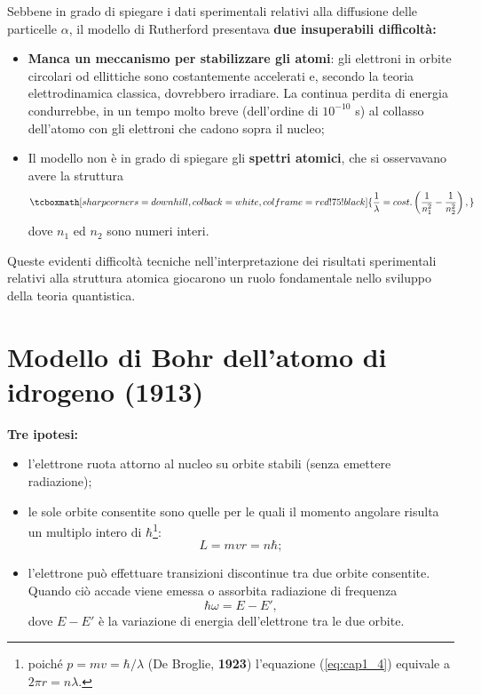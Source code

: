 \documentclass[a4paper,12pt,oneside]{book}
\begin{document}
Sebbene in grado di spiegare i dati sperimentali relativi alla diffusione delle particelle $\alpha$, il modello di Rutherford presentava \textbf{due insuperabili difficoltà:}
	\begin{itemize}
		\item \textbf{Manca un meccanismo per stabilizzare gli atomi}: gli elettroni in orbite circolari od ellittiche sono costantemente accelerati e, secondo la teoria elettrodinamica classica, dovrebbero irradiare. La continua perdita di energia condurrebbe, in un tempo molto breve (dell'ordine di $10^{-10}$ s) al collasso dell'atomo con gli elettroni che cadono sopra il nucleo;
		\item Il modello non è in grado di spiegare gli \textbf{spettri atomici}, che si osservavano avere la struttura
			\begin{equation}
				\tcboxmath[sharp corners=downhill ,colback=white,colframe=red!75!black]{
					\frac{1}{\lambda} = cost. \left( \frac{1}{n_1 ^2}-\frac{1}{n_2 ^2} \right),
					}
			\end{equation}
		dove $n_1$ ed $n_2$ sono numeri interi.\\
\end{itemize}

Queste evidenti difficoltà tecniche nell'interpretazione dei risultati sperimentali relativi alla struttura atomica giocarono un ruolo fondamentale nello sviluppo della teoria quantistica.
\section{Modello di Bohr dell'atomo di idrogeno (1913)}
\textbf{Tre ipotesi:}
	\begin{itemize}
	\item l'elettrone ruota attorno al nucleo su orbite stabili (senza emettere radiazione);
	\item le sole orbite consentite sono quelle per le quali il momento angolare risulta un multiplo intero di $\hbar$\footnote{poiché $p= mv =\hbar/\lambda$ (De Broglie, \textbf{1923}) l'equazione (\ref{eq:cap1_4}) equivale a $2\pi r=n\lambda$.}:
		\begin{equation}
			L= mvr =n\hbar ;
		\label{eq:cap1_4}
		\end{equation}
	\item l'elettrone può effettuare transizioni discontinue tra due orbite consentite. Quando ciò accade viene emessa o assorbita radiazione di frequenza
	\begin{equation}
			\hbar \omega = E-E' ,
		\label{eq:cap1_5}
		\end{equation}
dove $E-E'$ è la variazione di energia dell'elettrone tra le due orbite.\\
	\end{itemize}
	
\end{document}
